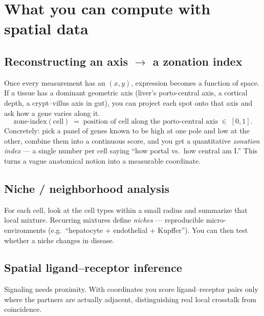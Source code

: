 \documentclass[11pt]{article}
\begin{document}
\section{What you can compute with spatial data}

\subsection{Reconstructing an axis $\rightarrow$ a zonation index}
Once every measurement has an $(x,y)$, expression becomes a function of space. If a tissue has a dominant geometric
axis (liver's porto-central axis, a cortical depth, a crypt--villus axis in gut), you can project each spot onto
that axis and ask how a gene varies along it.
\[
  \mathrm{zone\text{-}index}(\text{cell}) \;=\; \text{position of cell along the porto-central axis} \;\in\; [0,1].
\]
Concretely: pick a panel of genes known to be high at one pole and low at the other, combine them into a continuous
score, and you get a quantitative \emph{zonation index} --- a single number per cell saying ``how portal vs.\ how
central am I.'' This turns a vague anatomical notion into a measurable coordinate.

\subsection{Niche / neighborhood analysis}
For each cell, look at the cell types within a small radius and summarize that local mixture. Recurring mixtures
define \emph{niches} --- reproducible micro-environments (e.g.\ ``hepatocyte + endothelial + Kupffer''). You can
then test whether a niche changes in disease.

\subsection{Spatial ligand--receptor inference}
Signaling needs proximity. With coordinates you score ligand--receptor pairs only where the partners are actually
adjacent, distinguishing real local crosstalk from coincidence.
\end{document}
